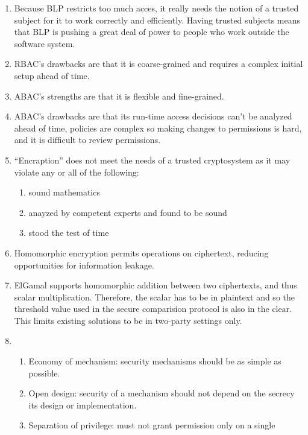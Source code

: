\documentclass{math}
\begin{document}
\begin{enumerate}
\begin{enumerate}
    (Secret, {Maps}) wants to \textbf{update} RITCampusMaps with classification
    (Public, {Maps}), the reference monitor checks the lattice and grants Jo
    permission to modify it if Jo's label dominates the map's label.
  \end{enumerate}
  \item Because BLP restricts too much acces, it really needs the notion of a
  trusted subject for it to work correctly and efficiently. Having trusted
  subjects means that BLP is pushing a great deal of power to people who work
  outside the software system.
  \item RBAC's drawbacks are that it is coarse-grained and requires a complex
  initial setup ahead of time.
  \item ABAC's strengths are that it is flexible and fine-grained.
  \item ABAC's drawbacks are that its run-time access decisions can't be
  analyzed ahead of time, policies are complex so making changes to permissions
  is hard, and it is difficult to review permissions.
  \item ``Encraption'' does not meet the needs of a trusted cryptosystem as it
  may violate any or all of the following:
  \begin{enumerate}
    \item sound mathematics
    \item anayzed by competent experts and found to be sound
    \item stood the test of time
  \end{enumerate}
  \item Homomorphic encryption permits operations on ciphertext, reducing
  opportunities for information leakage.
  \item ElGamal supports homomorphic addition between two ciphertexts, and thus
  scalar multiplication. Therefore, the scalar has to be in plaintext and so the
  threshold value used in the secure comparision protocol is also in the clear.
  This limits existing solutions to be in two-party settings only.
  \item \begin{enumerate}
    \item Economy of mechanism: security mechanisms should be as simple as
    possible.
    \item Open design: security of a mechanism should not depend on the secrecy
    its design or implementation.
    \item Separation of privilege: must not grant permission only on a single

\end{enumerate}
\end{enumerate}
\end{document}
